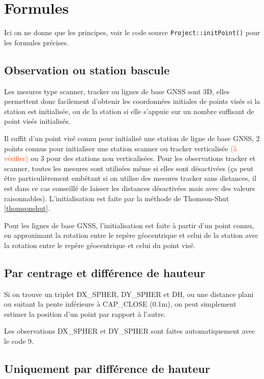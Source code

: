\documentclass[french]{report}
\newcommand{\revoir}[1]{\textcolor{OrangeRed}{#1}}
\begin{document}
\section{Formules}

Ici on ne donne que les principes, voir le code source \texttt{Project::initPoint()} pour les formules précises.

\subsection{Observation ou station bascule}

Les mesures type scanner, tracker ou lignes de base GNSS sont 3D, elles permettent donc facilement d'obtenir les coordonnées initiales de points visés si la station
est initialisée, ou de la station si elle s'appuie sur un nombre suffisant de point visés initialisés.

Il suffit d'un point visé connu pour initialisé une station de ligne de base GNSS, 2 points connus pour initialiser une station scanner ou tracker verticalisée
\revoir{(à vérifier)} ou 3 pour des stations non verticalisées.
Pour les observations tracker et scanner, toutes les mesures sont utilisées même si elles sont désactivées (ça peut être particulièrement embêtant si on utilise
des mesures tracker sans distances, il est dans ce cas conseillé de laisser les distances désactivées mais avec des valeurs raisonnables).
L'initialisation est faite par la méthode de Thomson-Shut \ref{thomsonshut}.

Pour les lignes de base GNSS, l'initialisation est faite à partir d'un point connu, en approximant la rotation entre le repère géocentrique et celui de la station
avec la rotation entre le repère géocentrique et celui du point visé.

\subsection{Par centrage et différence de hauteur}

Si on trouve un triplet DX\_SPHER, DY\_SPHER et DH, ou une distance plani ou suitant la pente inférieure à CAP\_CLOSE (0.1m),
on peut simplement estimer la position d'un point par rapport à l'autre.

Les observations DX\_SPHER et DY\_SPHER sont faites automatiquement avec le code 9.

\subsection{Uniquement par différence de hauteur}
\end{document}
